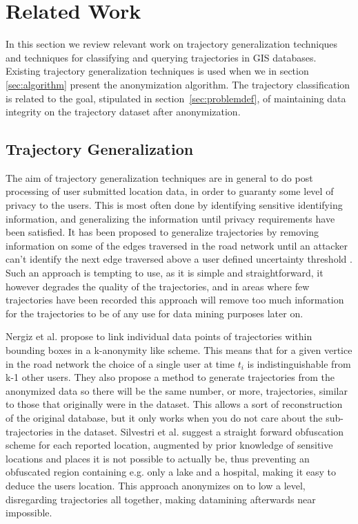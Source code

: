 \section{Related Work} \label{sec:rel_work}

In this section we review relevant work on trajectory generalization techniques and techniques for classifying and querying trajectories in GIS databases. Existing trajectory generalization techniques is used when we in section \ref{sec:algorithm} present the anonymization algorithm. The trajectory classification is related to the goal, stipulated in section~\ref{sec:problemdef}, of maintaining data integrity on the trajectory dataset after anonymization.


\subsection{Trajectory Generalization}

The aim of trajectory generalization techniques are in general to do post processing of user submitted location data, in order to guaranty some level of privacy to the users. This is most often done by identifying sensitive identifying information, and generalizing the information \cite{trajecGeneral09, semantic08} until privacy requirements have been satisfied. It has been proposed to generalize trajectories by removing information on some of the edges traversed in the road network until an attacker can't identify the next edge traversed above a user defined uncertainty threshold \cite{ccs07}. Such an approach is tempting to use, as it is simple and straightforward, it however degrades the quality of the trajectories, and in areas where few trajectories have been recorded this approach will remove too much information for the trajectories to be of any use for data mining purposes later on.

Nergiz et al.\cite{trajecGeneral09} propose to link individual data points of trajectories within bounding boxes in a \mbox{k-anonymity} like scheme. This means that for a given vertice in the road network the choice of a single user at time $t_i$ is indistinguishable from k-1 other users. They also propose a method to generate trajectories from the anonymized data so there will be the same number, or more, trajectories, similar to those that originally were in the dataset. This allows a sort of reconstruction of the original database, but it only works when you do not care about the sub-trajectories in the dataset. 
Silvestri et al. \cite{semantic08} suggest a straight forward obfuscation scheme for each reported location, augmented by prior knowledge of sensitive locations and places it is not possible to actually be, thus preventing an obfuscated region containing e.g. only a lake and a hospital, making it easy to deduce the users location. This approach anonymizes on to low a level, disregarding trajectories all together, making datamining afterwards near impossible.

